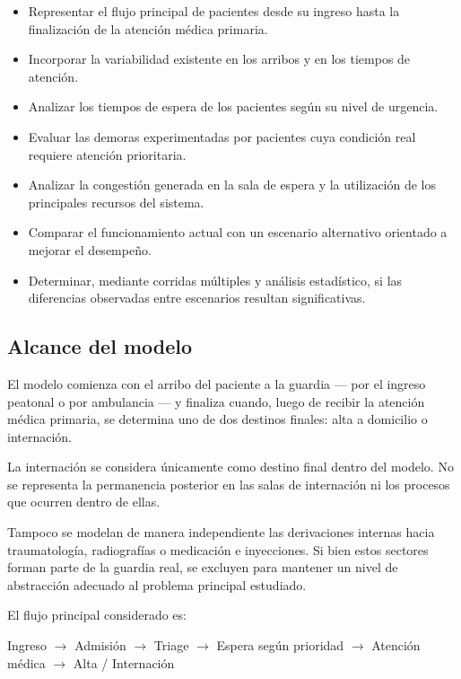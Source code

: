 \begin{itemize}
  \item Representar el flujo principal de pacientes desde su ingreso hasta la
  finalización de la atención médica primaria.
  \item Incorporar la variabilidad existente en los arribos y en los tiempos
  de atención.
  \item Analizar los tiempos de espera de los pacientes según su nivel de
  urgencia.
  \item Evaluar las demoras experimentadas por pacientes cuya condición real
  requiere atención prioritaria.
  \item Analizar la congestión generada en la sala de espera y la utilización
  de los principales recursos del sistema.
  \item Comparar el funcionamiento actual con un escenario alternativo
  orientado a mejorar el desempeño.
  \item Determinar, mediante corridas múltiples y análisis estadístico, si las
  diferencias observadas entre escenarios resultan significativas.
\end{itemize}

\subsection{Alcance del modelo}

El modelo comienza con el arribo del paciente a la guardia --- por el ingreso
peatonal o por ambulancia --- y finaliza cuando, luego de recibir la atención
médica primaria, se determina uno de dos destinos finales: alta a domicilio
o internación.

La internación se considera únicamente como destino final dentro del modelo.
No se representa la permanencia posterior en las salas de internación ni los
procesos que ocurren dentro de ellas.

Tampoco se modelan de manera independiente las derivaciones internas hacia
traumatología, radiografías o medicación e inyecciones. Si bien estos
sectores forman parte de la guardia real, se excluyen para mantener un nivel
de abstracción adecuado al problema principal estudiado.

El flujo principal considerado es:

\begin{center}
Ingreso $\rightarrow$ Admisión $\rightarrow$ Triage $\rightarrow$ Espera según
prioridad $\rightarrow$ Atención médica $\rightarrow$ Alta / Internación
\end{center}

